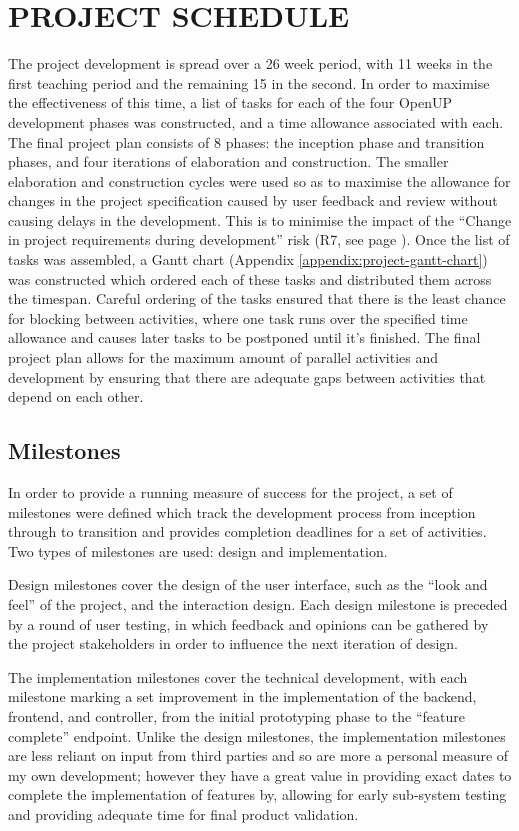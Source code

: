 \section{PROJECT SCHEDULE \hrulefill}
The project development is spread over a 26 week period, with 11 weeks in the
first teaching period and the remaining 15 in the second. In order to maximise
the effectiveness of this time, a list of tasks for each of the four OpenUP
development phases was constructed, and a time allowance associated with
each. The final project plan consists of 8 phases: the inception phase and
transition phases, and four iterations of elaboration and construction.  The
smaller elaboration and construction cycles were used so as to maximise the
allowance for changes in the project specification caused by user feedback and
review without causing delays in the development. This is to minimise the impact
of the ``Change in project requirements during development'' risk (R7, see page
\pageref{tab:risk-assessment}). Once the list of tasks was assembled, a Gantt
chart (Appendix \ref{appendix:project-gantt-chart}) was constructed which
ordered each of these tasks and distributed them across the timespan. Careful
ordering of the tasks ensured that there is the least chance for blocking
between activities, where one task runs over the specified time allowance and
causes later tasks to be postponed until it's finished.  The final project plan
allows for the maximum amount of parallel activities and development by ensuring
that there are adequate gaps between activities that depend on each other.

\subsection{Milestones}
In order to provide a running measure of success for the project, a set of
milestones were defined which track the development process from inception
through to transition and provides completion deadlines for a set of activities.
Two types of milestones are used: design and implementation.

Design milestones cover the design of the user interface, such as the ``look and
feel'' of the project, and the interaction design. Each design milestone is
preceded by a round of user testing, in which feedback and opinions can be
gathered by the project stakeholders in order to influence the next iteration of
design.

The implementation milestones cover the technical development, with each
milestone marking a set improvement in the implementation of the backend,
frontend, and controller, from the initial prototyping phase to the ``feature
complete'' endpoint. Unlike the design milestones, the implementation milestones
are less reliant on input from third parties and so are more a personal measure
of my own development; however they have a great value in providing exact dates
to complete the implementation of features by, allowing for early sub-system
testing and providing adequate time for final product validation.

